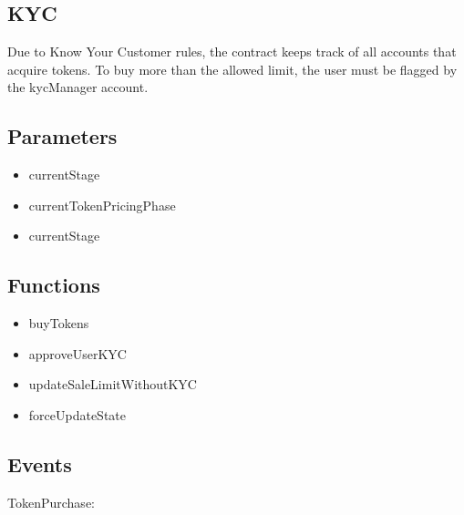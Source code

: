\documentclass[11pt]{article} %
\begin{document}
\subsection{KYC}
Due to Know Your Customer rules, the contract keeps track of all accounts that acquire tokens. To buy more than the allowed limit, the user must be flagged by the kycManager account.

\subsection{Parameters}
\begin{itemize}
\item currentStage
\item currentTokenPricingPhase
\item currentStage
\end{itemize}

\subsection{Functions}
\begin{itemize}
\item buyTokens
\item approveUserKYC
\item updateSaleLimitWithoutKYC
\item forceUpdateState
\end{itemize}

\subsection{Events}

TokenPurchase:
\end{document}
